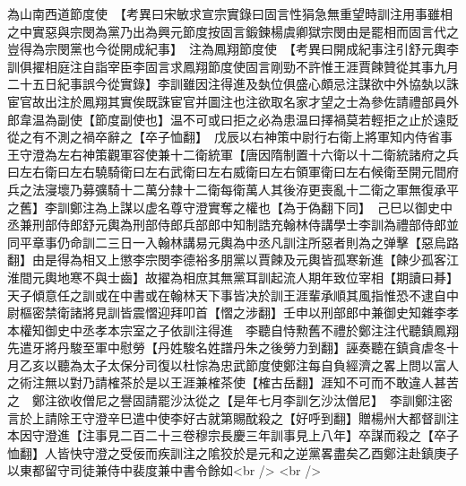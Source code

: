 為山南西道節度使　【考異曰宋敏求宣宗實錄曰固言性狷急無重望時訓注用事雖相之中實惡與宗閔為黨乃出為興元節度按固言鍛鍊楊虞卿獄宗閔由是罷相而固言代之豈得為宗閔黨也今從開成紀事】　注為鳳翔節度使　【考異曰開成紀事注引舒元輿李訓俱擢相庭注自詣宰臣李固言求鳳翔節度使固言剛勁不許惟王涯賈餗贊從其事九月二十五日紀事誤今從實錄】李訓雖因注得進及埶位俱盛心頗忌注謀欲中外協埶以誅宦官故出注於鳳翔其實俟既誅宦官并圖注也注欲取名家才望之士為參佐請禮部員外郎韋温為副使【節度副使也】温不可或曰拒之必為患温曰擇禍莫若輕拒之止於遠貶從之有不測之禍卒辭之【卒子恤翻】　戊辰以右神策中尉行右衛上將軍知内侍省事王守澄為左右神策觀軍容使兼十二衛統軍【唐因隋制置十六衛以十二衛統諸府之兵曰左右衛曰左右驍騎衛曰左右武衛曰左右威衛曰左右領軍衛曰左右候衛至開元間府兵之法寖壞乃募彍騎十二萬分隸十二衛每衛萬人其後洊更喪亂十二衛之軍無復承平之舊】李訓鄭注為上謀以虚名尊守澄實奪之權也【為于偽翻下同】　己巳以御史中丞兼刑部侍郎舒元輿為刑部侍郎兵部郎中知制誥充翰林侍講學士李訓為禮部侍郎並同平章事仍命訓二三日一入翰林講易元輿為中丞凡訓注所惡者則為之弹擊【惡烏路翻】由是得為相又上懲李宗閔李德裕多朋黨以賈餗及元輿皆孤寒新進【餗少孤客江淮間元輿地寒不與士齒】故擢為相庶其無黨耳訓起流人期年致位宰相【期讀曰朞】天子傾意任之訓或在中書或在翰林天下事皆决於訓王涯輩承順其風指惟恐不逮自中尉樞密禁衛諸將見訓皆震慴迎拜叩首【慴之涉翻】壬申以刑部郎中兼御史知雜李孝本權知御史中丞孝本宗室之子依訓注得進　李聽自恃勲舊不禮於鄭注注代聽鎮鳳翔先遣牙將丹駿至軍中慰勞【丹姓駿名姓譜丹朱之後勞力到翻】誣奏聽在鎮貪虐冬十月乙亥以聽為太子太保分司復以杜悰為忠武節度使鄭注每自負經濟之畧上問以富人之術注無以對乃請榷茶於是以王涯兼榷茶使【榷古岳翻】涯知不可而不敢違人甚苦之　鄭注欲收僧尼之譽固請罷沙汰從之【是年七月李訓乞沙汰僧尼】　李訓鄭注密言於上請除王守澄辛巳遣中使李好古就第賜酖殺之【好呼到翻】贈楊州大都督訓注本因守澄進【注事見二百二十三卷穆宗長慶三年訓事見上八年】卒謀而殺之【卒子恤翻】人皆快守澄之受佞而疾訓注之隂狡於是元和之逆黨畧盡矣乙酉鄭注赴鎮庚子以東都留守司徒兼侍中裴度兼中書令餘如<br />
<br />
